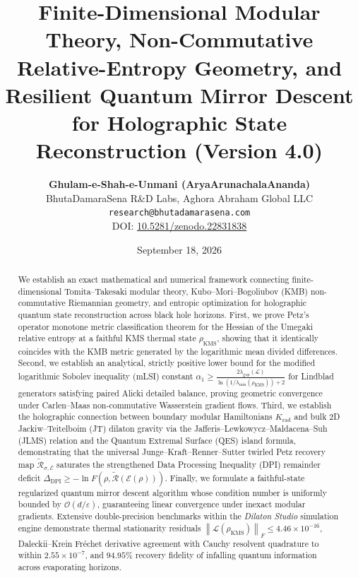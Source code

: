 \documentclass[11pt,a4paper]{article}
\title{\textbf{Finite-Dimensional Modular Theory, Non-Commutative Relative-Entropy Geometry, and Resilient Quantum Mirror Descent for Holographic State Reconstruction (Version 4.0)}}
\author{
    \textbf{Ghulam-e-Shah-e-Unmani (AryaArunachalaAnanda)}\\
    \small BhutaDamaraSena R\&D Labs, Aghora Abraham Global LLC\\
    \small \texttt{research@bhutadamarasena.com} \\
    \small DOI: \href{https://doi.org/10.5281/zenodo.22831838}{10.5281/zenodo.22831838}
}
\date{September 18, 2026}
\theoremstyle{plain}
\theoremstyle{definition}
\newcommand{\KMS}{\mathrm{KMS}}
\newcommand{\norm}[1]{\left\lVert #1 \right\rVert}
\begin{document}
\sloppy

\maketitle

\begin{abstract}
We establish an exact mathematical and numerical framework connecting finite-dimensional Tomita--Takesaki modular theory, Kubo--Mori--Bogoliubov (KMB) non-commutative Riemannian geometry, and entropic optimization for holographic quantum state reconstruction across black hole horizons. First, we prove Petz's operator monotone metric classification theorem for the Hessian of the Umegaki relative entropy at a faithful KMS thermal state $\rho_{\KMS}$, showing that it identically coincides with the KMB metric generated by the logarithmic mean divided differences. Second, we establish an analytical, strictly positive lower bound for the modified logarithmic Sobolev inequality (mLSI) constant $\alpha_1 \ge \frac{2\lambda_{\mathrm{gap}}(\mathcal{L})}{\ln(1/\lambda_{\min}(\rho_{\KMS})) + 2}$ for Lindblad generators satisfying paired Alicki detailed balance, proving geometric convergence under Carlen--Maas non-commutative Wasserstein gradient flows. Third, we establish the holographic connection between boundary modular Hamiltonians $K_{\mathrm{rad}}$ and bulk 2D Jackiw--Teitelboim (JT) dilaton gravity via the Jafferis--Lewkowycz--Maldacena--Suh (JLMS) relation and the Quantum Extremal Surface (QES) island formula, demonstrating that the universal Junge--Kraft--Renner--Sutter twirled Petz recovery map $\widetilde{\mathcal{R}}_{\sigma, \mathcal{E}}$ saturates the strengthened Data Processing Inequality (DPI) remainder deficit $\Delta_{\mathrm{DPI}} \ge -\ln F(\rho, \widetilde{\mathcal{R}}(\mathcal{E}(\rho)))$. Finally, we formulate a faithful-state regularized quantum mirror descent algorithm whose condition number is uniformly bounded by $\mathcal{O}(d/\varepsilon)$, guaranteeing linear convergence under inexact modular gradients. Extensive double-precision benchmarks within the \textit{Dilaton Studio} simulation engine demonstrate thermal stationarity residuals $\norm{\mathcal{L}(\rho_{\KMS})}_F \le 4.46 \times 10^{-16}$, Daleckii--Krein Fr\'{e}chet derivative agreement with Cauchy resolvent quadrature to within $2.55 \times 10^{-7}$, and $94.95\%$ recovery fidelity of infalling quantum information across evaporating horizons.
\end{abstract}

\newpage
\tableofcontents
\newpage
\end{document}
